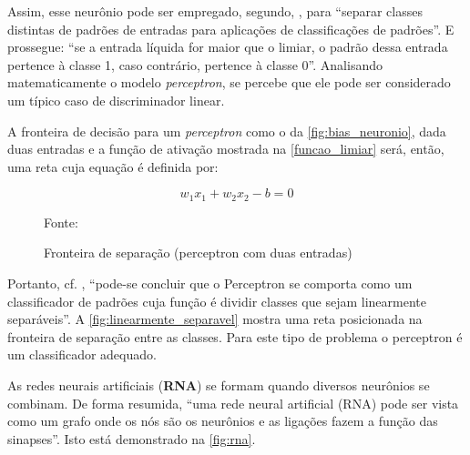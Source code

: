 Assim, esse neurônio pode ser empregado, segundo, , para ``separar classes distintas de padrões de entradas para aplicações de classificações de padrões''. E prossegue: ``se a entrada líquida for maior que o limiar, o padrão dessa entrada pertence à classe 1, caso contrário, pertence à classe 0''. Analisando matematicamente o modelo \textit{perceptron}, se percebe que ele pode ser considerado um típico caso de discriminador linear. 

A fronteira de decisão para um \textit{perceptron} como o da \autoref{fig:bias_neuronio}, dada duas entradas e a função de ativação mostrada na \autoref{funcao_limiar} será, então, uma reta cuja equação é definida por: 

\begin{equation}\label{eq_reta}
	w_1x_1 + w_2x_2 - b = 0
\end{equation}

\begin{figure}[H]
	\centering
	\caption{Fronteira de separação (perceptron com duas entradas)}
	
	{\scriptsize 	Fonte: }
	\label{fig:linearmente_separavel}
\end{figure}

Portanto, cf. , ``pode-se concluir que o Perceptron se comporta como um classificador de padrões cuja função é dividir classes que sejam linearmente separáveis''. A \autoref{fig:linearmente_separavel} mostra uma reta posicionada na fronteira de separação entre as classes. Para este tipo de problema o perceptron é um classificador adequado.

As redes neurais artificiais (\textbf{RNA}) se formam quando diversos neurônios se combinam. De forma resumida, ``uma rede neural artificial (RNA) pode ser vista como um grafo onde os nós são os neurônios e as ligações fazem a função das sinapses''. Isto está demonstrado na \autoref{fig:rna}.

